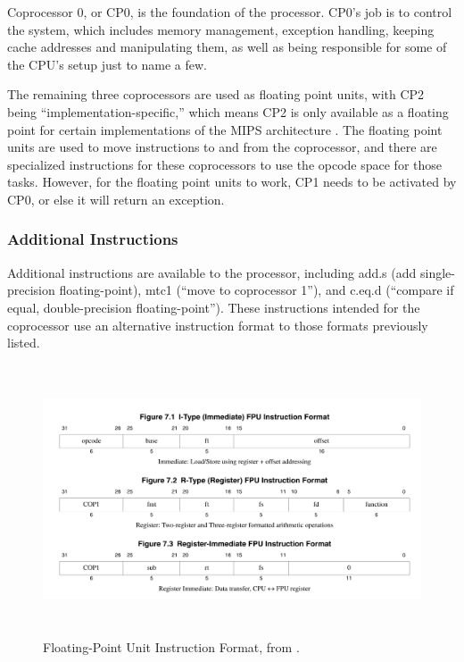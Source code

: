 \documentclass[
    paper=letter,
    parskip=half,
    fontsize=12pt,
    titlepage=firstiscover,
    toc=bibliography,
    numbers=endperiod
]{scrartcl}
\begin{document}
Coprocessor 0, or CP0, is the foundation of the processor. CP0's job is
to control the system, which includes memory management, exception
handling, keeping cache addresses and manipulating them, as well as
being responsible for some of the CPU's setup just to name a few.

The remaining three coprocessors are used as floating point units, with
CP2 being ``implementation-specific,'' which means CP2 is only available
as a floating point for certain implementations of the MIPS
architecture \cite[p.~74]{mips-specification}. The floating point units are used to move instructions to
and from the coprocessor, and there are specialized instructions for
these coprocessors to use the opcode space for those tasks. However, for
the floating point units to work, CP1 needs to be activated by CP0, or
else it will return an exception.





\subsubsection{Additional Instructions}

Additional instructions are available to the processor, including add.s
(add single-precision floating-point), mtc1 (``move to coprocessor 1''),
and c.eq.d (``compare if equal, double-precision floating-point''). These
instructions intended for the coprocessor use an alternative instruction
format to those formats previously listed.

\begin{figure}[H]
    \includegraphics[height=8cm]{fpu-instruction-formats}
    \caption{Floating-Point Unit Instruction Format, from \protect\cite{mips-specification}.}
\end{figure}
\end{document}
